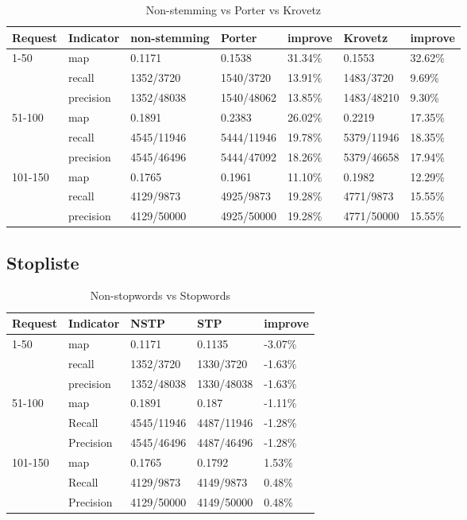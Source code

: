 \documentclass[a4paper]{article}
\begin{document}
\begin{table}[htp]
\centering
\begin{tabular}{|l|l|l|l|l|l|l|}
\hline
Request & Indicator & non-stemming & Porter     & improve & Krovetz    & improve \\ \hline
1-50    & map       & 0.1171       & 0.1538     & 31.34\% & 0.1553     & 32.62\% \\ \hline
        & recall    & 1352/3720    & 1540/3720  & 13.91\% & 1483/3720  & 9.69\%  \\ \hline
        & precision & 1352/48038   & 1540/48062 & 13.85\% & 1483/48210 & 9.30\%  \\ \hline
51-100  & map       & 0.1891       & 0.2383     & 26.02\% & 0.2219     & 17.35\% \\ \hline
        & recall    & 4545/11946   & 5444/11946 & 19.78\% & 5379/11946 & 18.35\% \\ \hline
        & precision & 4545/46496   & 5444/47092 & 18.26\% & 5379/46658 & 17.94\% \\ \hline
101-150 & map       & 0.1765       & 0.1961     & 11.10\% & 0.1982     & 12.29\% \\ \hline
        & recall    & 4129/9873    & 4925/9873  & 19.28\% & 4771/9873  & 15.55\% \\ \hline
        & precision & 4129/50000   & 4925/50000 & 19.28\% & 4771/50000 & 15.55\% \\ \hline
\end{tabular}
\caption{Non-stemming vs Porter vs Krovetz}
\label{tab:porter_vs_krovetz}
\end{table}

\subsection{Stopliste}


\begin{table}[htp]
\centering
\begin{tabular}{|l|l|l|l|l|}
\hline
Request & Indicator & NSTP       & STP        & improve \\ \hline
1-50    & map       & 0.1171     & 0.1135     & -3.07\% \\ \hline
        & recall    & 1352/3720  & 1330/3720  & -1.63\% \\ \hline
        & precision & 1352/48038 & 1330/48038 & -1.63\% \\ \hline
51-100  & map       & 0.1891     & 0.187      & -1.11\% \\ \hline
        & Recall    & 4545/11946 & 4487/11946 & -1.28\% \\ \hline
        & Precision & 4545/46496 & 4487/46496 & -1.28\% \\ \hline
101-150 & map       & 0.1765     & 0.1792     & 1.53\%  \\ \hline
        & Recall    & 4129/9873  & 4149/9873  & 0.48\%  \\ \hline
        & Precision & 4129/50000 & 4149/50000 & 0.48\%  \\ \hline
\end{tabular}
\caption{Non-stopwords vs Stopwords}
\label{nstp_vs_stp}
\end{table}
\end{document}
